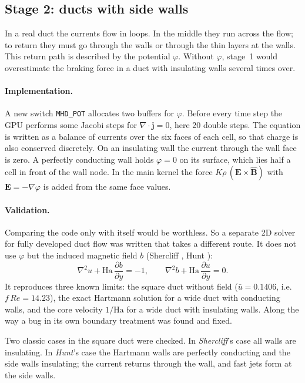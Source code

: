\subsection*{Stage 2: ducts with side walls}
In a real duct the currents flow in loops. In the middle they run across the flow; to return they must go through
the walls or through the thin layers at the walls. This return path is described by the potential $\varphi$.
Without $\varphi$, stage~1 would overestimate the braking force in a duct with insulating walls several times over.

\paragraph{Implementation.} A new switch \texttt{MHD\_POT} allocates two buffers for $\varphi$. Before every time
step the GPU performs some Jacobi steps for $\nabla\cdot\mathbf{j} = 0$, here 20 double steps. The equation is written
as a balance of currents over the six faces of each cell, so that charge is also conserved discretely. On an
insulating wall the current through the wall face is zero. A perfectly conducting wall holds $\varphi = 0$ on its
surface, which lies half a cell in front of the wall node. In the main kernel the force
$K\rho\,(\mathbf{E}\times\hat{\mathbf{B}})$ with $\mathbf{E} = -\nabla\varphi$ is added from the same face values.

\paragraph{Validation.} Comparing the code only with itself would be worthless. So a separate 2D solver for fully
developed duct flow was written that takes a different route. It does not use $\varphi$ but the induced magnetic
field $b$ (Shercliff \cite{shercliff1953}, Hunt \cite{hunt1965}):
\[
\nabla^2 u + \mathrm{Ha}\,\frac{\partial b}{\partial y} = -1,\qquad \nabla^2 b + \mathrm{Ha}\,\frac{\partial u}{\partial y} = 0 .
\]
It reproduces three known limits: the square duct without field ($\bar u = 0.1406$, i.e.\ $f\,\mathit{Re} = 14.23$),
the exact Hartmann solution for a wide duct with conducting walls, and the core velocity $1/\mathrm{Ha}$ for a wide duct
with insulating walls. Along the way a bug in its own boundary treatment was found and fixed.

Two classic cases in the square duct were checked. In \emph{Shercliff}'s case all walls are insulating. In
\emph{Hunt}'s case the Hartmann walls are perfectly conducting and the side walls insulating; the current returns
through the wall, and fast jets form at the side walls.

